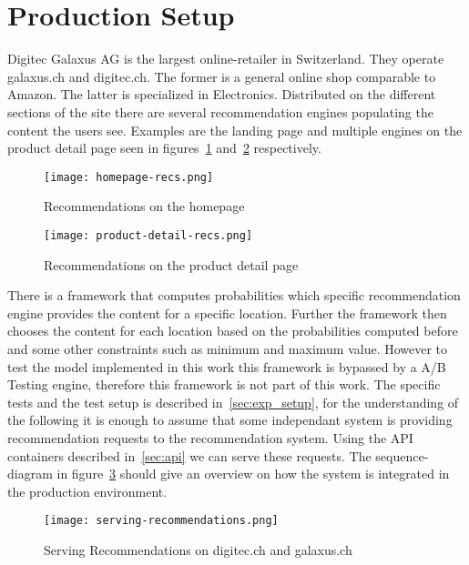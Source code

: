 \section{Production Setup}
Digitec Galaxus AG is the largest online-retailer in Switzerland.
They operate galaxus.ch and digitec.ch. The former is a general online shop comparable to Amazon. 
The latter is specialized in Electronics.
Distributed on the different sections of the site there are several recommendation engines populating the content the users see.
Examples are the landing page and multiple engines on the product detail page seen in figures~\ref{fig:homepage_recs} and~\ref{fig:product_detail_recs} respectively.

\begin{figure}[t]
	\centering
	\captionsetup{width=0.8\textwidth}
    \texttt{[image: homepage-recs.png]}
    \caption{Recommendations on the homepage}
    \label{fig:homepage_recs}
\end{figure}

\begin{figure}[t]
	\centering
	\captionsetup{width=0.8\textwidth}
    \texttt{[image: product-detail-recs.png]}
    \caption{Recommendations on the product detail page}
    \label{fig:product_detail_recs}
\end{figure}

There is a framework that computes probabilities which specific recommendation engine provides the content for a specific location.
Further the framework then chooses the content for each location based on the probabilities computed before and some other constraints such as minimum and maximum value.
However to test the model implemented in this work this framework is bypassed by a A/B Testing engine, therefore this framework is not part of this work.
The specific tests and the test setup is described in~\ref{sec:exp_setup}, for the understanding of the following it is enough to assume that some independant system is providing recommendation requests to the recommendation system.
Using the API containers described in~\ref{sec:api} we can serve these requests.
The sequence-diagram in figure~\ref{fig:serving_recs} should give an overview on how the system is integrated in the production environment.

\begin{figure}[t]
	\centering
	\captionsetup{width=0.8\textwidth}
    \texttt{[image: serving-recommendations.png]}
    \caption{Serving Recommendations on digitec.ch and galaxus.ch}
    \label{fig:serving_recs}
\end{figure}

